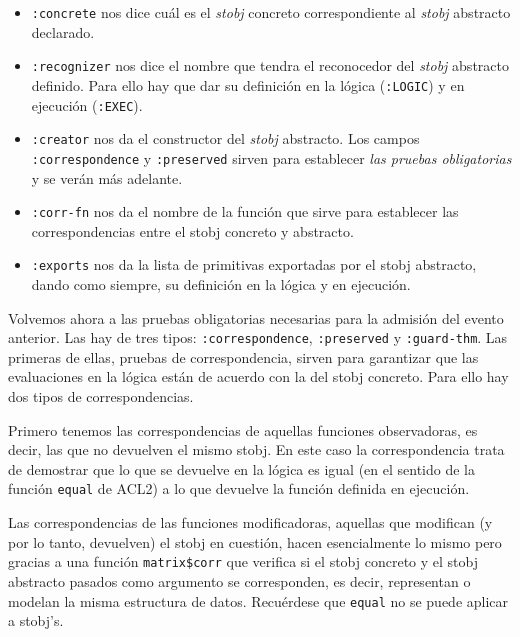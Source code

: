 \documentclass[a4paper,10pt]{article}
\begin{document}
\begin{itemize}
	\item \texttt{:concrete} nos dice cuál es el \emph{stobj} concreto correspondiente al \emph{stobj} abstracto declarado.
	\item \texttt{:recognizer} nos dice el nombre que tendra el reconocedor del \emph{stobj} abstracto definido. Para ello hay que dar su definición en la lógica (\texttt{:LOGIC}) y en ejecución (\texttt{:EXEC}).
	\item \texttt{:creator} nos da el constructor del \emph{stobj} abstracto. Los campos \texttt{:correspondence} y \texttt{:preserved} sirven para establecer \emph{las pruebas obligatorias} y se verán más adelante.
	\item \texttt{:corr-fn} nos da el nombre de la función que sirve para establecer las correspondencias entre el stobj concreto y abstracto. 
	\item \texttt{:exports} nos da la lista de primitivas exportadas por el stobj abstracto, dando como siempre, su definición en la lógica y en ejecución.
\end{itemize}

\par \vspace{10pt}

Volvemos ahora a las pruebas obligatorias necesarias para la admisión del evento anterior. Las hay de tres tipos: \texttt{:correspondence}, \texttt{:preserved} y \texttt{:guard-thm}. Las primeras de ellas, pruebas de correspondencia, sirven para garantizar que las evaluaciones en la lógica están de acuerdo con la del stobj concreto. Para ello hay dos tipos de correspondencias.

\par \vspace{10pt}

Primero tenemos las correspondencias de aquellas funciones observadoras, es decir, las que no devuelven el mismo stobj. En este caso la correspondencia trata de demostrar que lo que se devuelve en la lógica es igual (en el sentido de la función \texttt{equal} de ACL2) a lo que devuelve la función definida en ejecución.

\par \vspace{10pt}

Las correspondencias de las funciones modificadoras, aquellas que modifican (y por lo tanto, devuelven) el stobj en cuestión, hacen esencialmente lo mismo pero gracias a una función \texttt{matrix\$corr} que verifica si el stobj concreto y el stobj abstracto pasados como argumento se corresponden, es decir, representan o modelan la misma estructura de datos. Recuérdese que \texttt{equal} no se puede aplicar a stobj's. 
\end{document}

